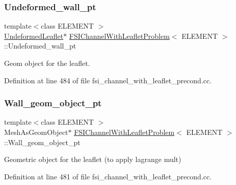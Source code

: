 \subsubsection{\texorpdfstring{Undeformed\+\_\+wall\+\_\+pt}{Undeformed\_wall\_pt}}
{\footnotesize\ttfamily template$<$class E\+L\+E\+M\+E\+NT $>$ \\
\hyperlink{classUndeformedLeaflet}{Undeformed\+Leaflet}$\ast$ \hyperlink{classFSIChannelWithLeafletProblem}{F\+S\+I\+Channel\+With\+Leaflet\+Problem}$<$ E\+L\+E\+M\+E\+NT $>$\+::Undeformed\+\_\+wall\+\_\+pt\hspace{0.3cm}{\ttfamily [private]}}



Geom object for the leaflet. 



Definition at line 484 of file fsi\+\_\+channel\+\_\+with\+\_\+leaflet\+\_\+precond.\+cc.

\mbox{\label{classFSIChannelWithLeafletProblem_a2c6f28af7e78288f5b6d60f69036c8ee}} 
\subsubsection{\texorpdfstring{Wall\+\_\+geom\+\_\+object\+\_\+pt}{Wall\_geom\_object\_pt}}
{\footnotesize\ttfamily template$<$class E\+L\+E\+M\+E\+NT $>$ \\
Mesh\+As\+Geom\+Object$\ast$ \hyperlink{classFSIChannelWithLeafletProblem}{F\+S\+I\+Channel\+With\+Leaflet\+Problem}$<$ E\+L\+E\+M\+E\+NT $>$\+::Wall\+\_\+geom\+\_\+object\+\_\+pt\hspace{0.3cm}{\ttfamily [private]}}



Geometric object for the leaflet (to apply lagrange mult) 



Definition at line 481 of file fsi\+\_\+channel\+\_\+with\+\_\+leaflet\+\_\+precond.\+cc.

\mbox{\label{classFSIChannelWithLeafletProblem_a943437726f0a54fa8f7fc9ffb12bc4cd}} 

